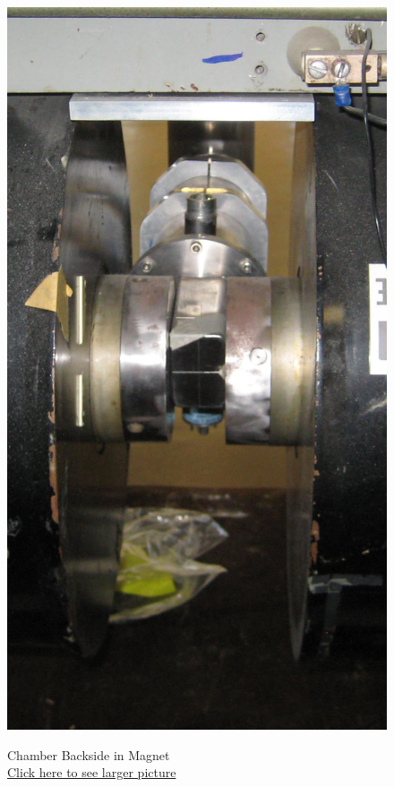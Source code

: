 \documentclass{../lab}
\begin{document}
\begin{figure}[H]
\captionsetup{justification=centering}
  \href{http://experimentationlab.berkeley.edu/sites/default/files/images/Magnet_Backside_Polepieces_Crop_3307.jpg}{\includegraphics[width=\linewidth,keepaspectratio]{images/Magnet_Backside_Polepieces_Crop_3307.jpg}}
  \caption{Chamber Backside in Magnet \\ \href{http://experimentationlab.berkeley.edu/sites/default/files/images/Magnet_Backside_Polepieces_Crop_3307.jpg}{Click here to see larger picture}}

\end{figure}
\end{document}
